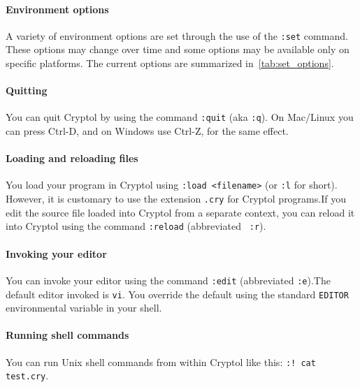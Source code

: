 \paragraph*{Environment options}
A variety of environment options are set through the use of the
\texttt{:set} command.  These options may change over time and some
options may be available only on specific platforms.  The current
options are summarized in~\autoref{tab:set_options}.


\paragraph*{Quitting}
You can quit Cryptol by using the command {\tt :quit} (aka
\texttt{:q}).  On Mac/Linux you can press Ctrl-D, and on Windows use
Ctrl-Z, for the same effect.\indCmdQuit

\paragraph*{Loading and reloading files}
You load your program in Cryptol using {\tt :load <filename>} (or
\texttt{:l} for short).  However, it is customary to use the extension
{\tt .cry} for Cryptol programs.\indCmdLoad If you edit the source
file loaded into Cryptol from a separate context, you can reload it
into Cryptol using the command {\tt :reload} (abbreviated {\tt
  :r}).\indCmdReload

\paragraph*{Invoking your editor}
You can invoke your editor using the command {\tt :edit} (abbreviated
\texttt{:e}).\indCmdEdit The default editor invoked is
\texttt{vi}.  You override the default using the standard
\texttt{EDITOR} environmental variable in your shell.\indSettingEditor


\paragraph*{Running shell commands}
You can run Unix shell commands from within Cryptol like this: {\tt :!
  cat test.cry}.\indCmdShell


